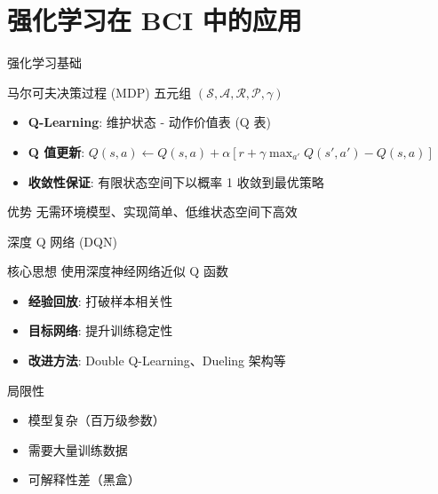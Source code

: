 \section{强化学习在 BCI 中的应用}

\begin{frame}{强化学习基础}
    \begin{block}{马尔可夫决策过程 (MDP)}
        五元组 $(\mathcal{S}, \mathcal{A}, \mathcal{R}, \mathcal{P}, \gamma)$
    \end{block}
    
    \vspace{0.5cm}
    \begin{itemize}
        \item \textbf{Q-Learning}: 维护状态 - 动作价值表 (Q 表)
        \item \textbf{Q 值更新}: $Q(s, a) \leftarrow Q(s, a) + \alpha [r + \gamma \max_{a'} Q(s', a') - Q(s, a)]$
        \item \textbf{收敛性保证}: 有限状态空间下以概率 1 收敛到最优策略
    \end{itemize}
    
    \vspace{0.5cm}
    \begin{exampleblock}{优势}
        无需环境模型、实现简单、低维状态空间下高效
    \end{exampleblock}
\end{frame}

\begin{frame}{深度 Q 网络 (DQN)}
    \begin{block}{核心思想}
        使用深度神经网络近似 Q 函数
    \end{block}
    
    \vspace{0.5cm}
    \begin{itemize}
        \item \textbf{经验回放}: 打破样本相关性
        \item \textbf{目标网络}: 提升训练稳定性
        \item \textbf{改进方法}: Double Q-Learning、Dueling 架构等
    \end{itemize}
    
    \vspace{0.5cm}
    \begin{alertblock}{局限性}
        \begin{itemize}
            \item 模型复杂（百万级参数）
            \item 需要大量训练数据
            \item 可解释性差（黑盒）
        \end{itemize}
    \end{alertblock}
\end{frame}

